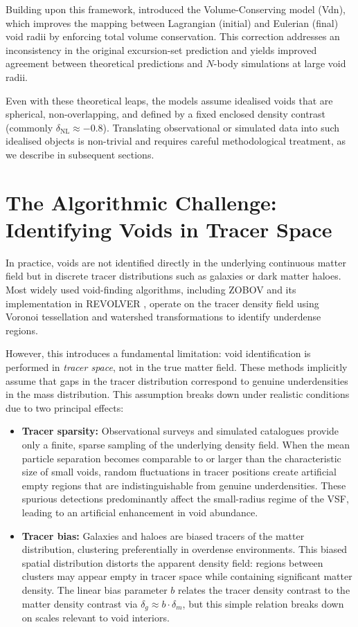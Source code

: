 \documentclass[12pt]{report}
\begin{document}
Building upon this framework, \citet{Jennings2013} introduced the Volume-Conserving model (Vdn), which improves the mapping between Lagrangian (initial) and Eulerian (final) void radii by enforcing total volume conservation. This correction addresses an inconsistency in the original excursion-set prediction and yields improved agreement between theoretical predictions and $N$-body simulations at large void radii.

Even with these theoretical leaps, the models assume idealised voids that are spherical, non-overlapping, and defined by a fixed enclosed density contrast (commonly $\delta_\mathrm{NL} \approx -0.8$). Translating observational or simulated data into such idealised objects is non-trivial and requires careful methodological treatment, as we describe in subsequent sections.


\section{The Algorithmic Challenge: Identifying Voids in Tracer Space}

In practice, voids are not identified directly in the underlying continuous matter field but in discrete tracer distributions such as galaxies or dark matter haloes. Most widely used void-finding algorithms, including ZOBOV \citep{Neyrinck2008} and its implementation in REVOLVER \citep{Nadathur2019}, operate on the tracer density field using Voronoi tessellation and watershed transformations to identify underdense regions.

However, this introduces a fundamental limitation: void identification is performed in \emph{tracer space}, not in the true matter field. These methods implicitly assume that gaps in the tracer distribution correspond to genuine underdensities in the mass distribution. This assumption breaks down under realistic conditions due to two principal effects:

\begin{itemize}
    \item \textbf{Tracer sparsity:} Observational surveys and simulated catalogues provide only a finite, sparse sampling of the underlying density field. When the mean particle separation becomes comparable to or larger than the characteristic size of small voids, random fluctuations in tracer positions create artificial empty regions that are indistinguishable from genuine underdensities. These spurious detections predominantly affect the small-radius regime of the VSF, leading to an artificial enhancement in void abundance.

    \item \textbf{Tracer bias:} Galaxies and haloes are biased tracers of the matter distribution, clustering preferentially in overdense environments. This biased spatial distribution distorts the apparent density field: regions between clusters may appear empty in tracer space while containing significant matter density. The linear bias parameter $b$ relates the tracer density contrast to the matter density contrast via $\delta_g \approx b \cdot \delta_m$, but this simple relation breaks down on scales relevant to void interiors.
\end{itemize}
\end{document}
